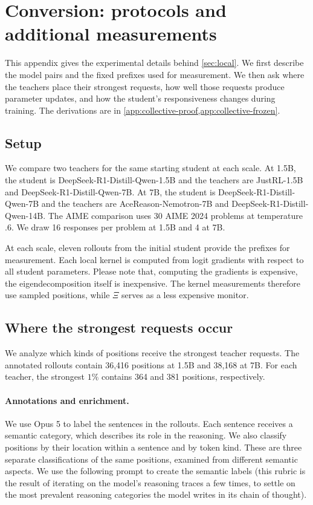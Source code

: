 \section{Conversion: protocols and additional measurements}
\label{app:collective}\label{app:collective-data}
This appendix gives the experimental details behind \cref{sec:local}. We first describe the model pairs and the fixed prefixes used for measurement. We then ask where the teachers place their strongest requests, how well those requests produce parameter updates, and how the student's responsiveness changes during training. The derivations are in \cref{app:collective-proof,app:collective-frozen}.

\subsection{Setup}
\label{app:collective-protocol}
We compare two teachers for the same starting student at each scale. At 1.5B, the student is DeepSeek-R1-Distill-Qwen-1.5B and the teachers are JustRL-1.5B and DeepSeek-R1-Distill-Qwen-7B. At 7B, the student is DeepSeek-R1-Distill-Qwen-7B and the teachers are AceReason-Nemotron-7B and DeepSeek-R1-Distill-Qwen-14B. The AIME comparison uses 30 AIME 2024 problems at temperature $.6$. We draw 16 responses per problem at 1.5B and 4 at 7B.

At each scale, eleven rollouts from the initial student provide the prefixes for measurement. Each local kernel is computed from logit gradients with respect to all student parameters. Please note that, computing the gradients is expensive, the eigendecomposition itself is inexpensive. The kernel measurements therefore use sampled positions, while $\Xi$ serves as a less expensive monitor.


\subsection{Where the strongest requests occur}
\label{app:collective-types}
We analyze which kinds of positions receive the strongest teacher requests. The annotated rollouts contain 36,416 positions at 1.5B and 38,168 at 7B. For each teacher, the strongest $1\%$ contains 364 and 381 positions, respectively. 

\paragraph{Annotations and enrichment.}\label{app:semantic-protocol}
We use Opus 5 to label the sentences in the rollouts. Each sentence receives a semantic category, which describes its role in the reasoning. We also classify positions by their location within a sentence and by token kind. These are three separate classifications of the same positions, examined from different semantic aspects. We use the following prompt to create the semantic labels (this rubric is the result of iterating on the model's reasoning traces a few times, to settle on the most prevalent reasoning categories the model writes in its chain of thought).

